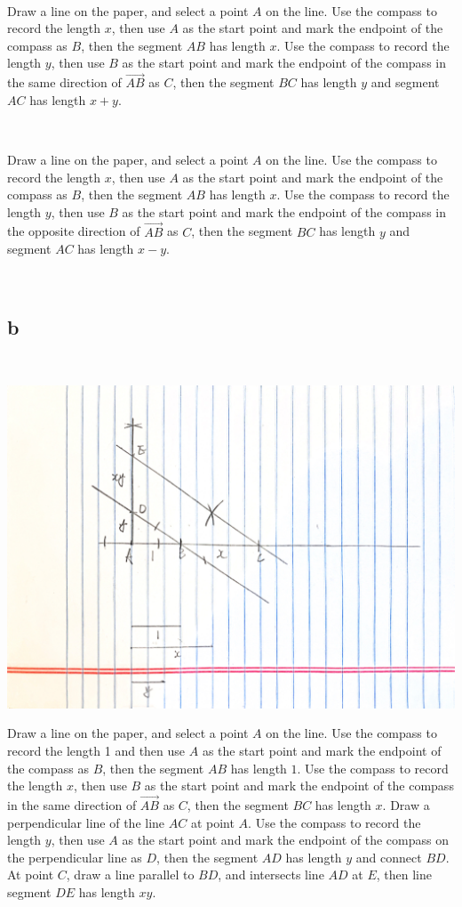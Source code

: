 \documentclass{article}
\begin{document}
~

Draw a line on the paper, and select a point $A$ on the line. Use the compass to record the length $x$, then use $A$ as the start point and mark the endpoint of the compass as $B$, then the segment $AB$ has length $x$. Use the compass to record the length $y$, then use $B$ as the start point and mark the endpoint of the compass in the same direction of $\overrightarrow{AB}$ as $C$, then the segment $BC$ has length $y$ and segment $AC$ has length $x+y$.

~

Draw a line on the paper, and select a point $A$ on the line. Use the compass to record the length $x$, then use $A$ as the start point and mark the endpoint of the compass as $B$, then the segment $AB$ has length $x$. Use the compass to record the length $y$, then use $B$ as the start point and mark the endpoint of the compass in the opposite direction of $\overrightarrow{AB}$ as $C$, then the segment $BC$ has length $y$ and segment $AC$ has length $x-y$.

~

\subsection*{b}

~

\includegraphics[scale=0.05]{HW_0214/2b_1.jpg}

Draw a line on the paper, and select a point $A$ on the line. Use the compass to record the length 1 and then use $A$ as the start point and mark the endpoint of the compass as $B$, then the segment $AB$ has length $1$. Use the compass to record the length $x$, then use $B$ as the start point and mark the endpoint of the compass in the same direction of $\overrightarrow{AB}$ as $C$, then the segment $BC$ has length $x$. Draw a perpendicular line of the line $AC$ at point $A$. Use the compass to record the length $y$, then use $A$ as the start point and mark the endpoint of the compass on the perpendicular line as $D$, then the segment $AD$ has length $y$ and connect $BD$. At point $C$, draw a line parallel to $BD$, and intersects line $AD$ at $E$, then line segment $DE$ has length $xy$.
\end{document}
